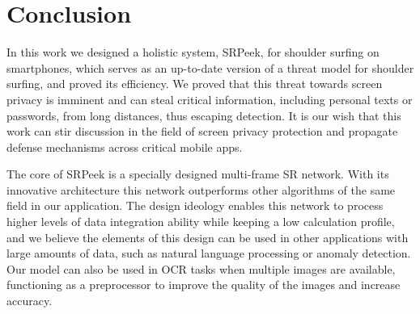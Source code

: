 \section{Conclusion}
\label{sec-conclusion}
In this work we designed a holistic system, SRPeek, for shoulder surfing on smartphones, which serves as an up-to-date version of a threat model for shoulder surfing, and proved its efficiency. We proved that this threat towards screen privacy is imminent and can steal critical information, including personal texts or passwords, from long distances, thus escaping detection. It is our wish that this work can stir discussion in the field of screen privacy protection and propagate defense mechanisms across critical mobile apps.

The core of SRPeek is a specially designed multi-frame SR network. With its innovative architecture this network outperforms other algorithms of the same field in our application. The design ideology enables this network to process higher levels of data integration ability while keeping a low calculation profile, and we believe the elements of this design can be used in other applications with large amounts of data, such as natural language processing or anomaly detection. Our model can also be used in OCR tasks when multiple images are available, functioning as a preprocessor to improve the quality of the images and increase accuracy.

